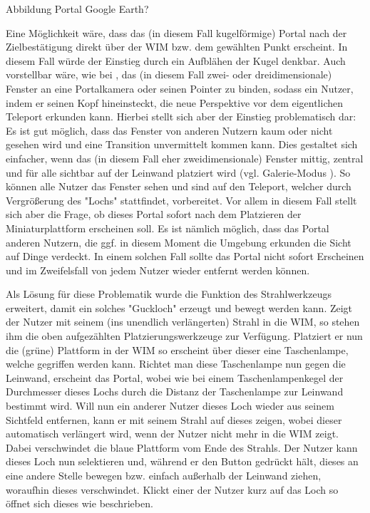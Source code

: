 Abbildung Portal Google Earth?

Eine Möglichkeit wäre, dass das (in diesem Fall kugelförmige) Portal nach der Zielbestätigung direkt über der WIM bzw. dem gewählten Punkt erscheint. In diesem Fall würde der Einstieg durch ein Aufblähen der Kugel denkbar.
Auch vorstellbar wäre, wie bei \cite{Kunert2014Photoportals}, das (in diesem Fall zwei- oder dreidimensionale) Fenster an eine Portalkamera oder seinen Pointer zu binden, sodass ein Nutzer, indem er seinen Kopf hineinsteckt, die neue Perspektive vor dem eigentlichen Teleport erkunden kann. Hierbei stellt sich aber der Einstieg problematisch dar: Es ist gut möglich, dass das Fenster von anderen Nutzern kaum oder nicht gesehen wird und eine Transition unvermittelt kommen kann.
Dies gestaltet sich einfacher, wenn das (in diesem Fall eher zweidimensionale) Fenster mittig, zentral und für alle sichtbar auf der Leinwand platziert wird (vgl. Galerie-Modus \cite{Kunert2014Photoportals}). So können  alle Nutzer das Fenster sehen und sind auf den Teleport, welcher durch Vergrößerung des "Lochs" stattfindet, vorbereitet.
Vor allem in diesem Fall stellt sich aber die Frage, ob dieses Portal sofort nach dem Platzieren der Miniaturplattform erscheinen soll. Es ist nämlich möglich, dass das Portal anderen Nutzern, die ggf. in diesem Moment die Umgebung erkunden die Sicht auf Dinge verdeckt. In einem solchen Fall sollte das Portal nicht sofort Erscheinen und im Zweifelsfall von jedem Nutzer wieder entfernt werden können.

Als Lösung für diese Problematik wurde die Funktion des Strahlwerkzeugs erweitert, damit ein solches "Guckloch" erzeugt und bewegt werden kann.
Zeigt der Nutzer mit seinem (ins unendlich verlängerten) Strahl in die WIM, so stehen ihm die oben aufgezählten Platzierungswerkzeuge zur Verfügung. Platziert er nun die (grüne) Plattform in der WIM so erscheint über dieser eine Taschenlampe, welche gegriffen werden kann. Richtet man diese Taschenlampe nun gegen die Leinwand, erscheint das Portal, wobei wie bei einem Taschenlampenkegel der Durchmesser dieses Lochs durch die Distanz der Taschenlampe zur Leinwand bestimmt wird. Will nun ein anderer Nutzer dieses Loch wieder aus seinem Sichtfeld entfernen, kann er mit seinem Strahl auf dieses zeigen, wobei dieser automatisch verlängert wird, wenn der Nutzer nicht mehr in die WIM zeigt. Dabei verschwindet die blaue Plattform vom Ende des Strahls. Der Nutzer kann dieses Loch nun selektieren und, während er den Button gedrückt hält, dieses an eine andere Stelle bewegen bzw. einfach außerhalb der Leinwand ziehen, woraufhin dieses verschwindet.
Klickt einer der Nutzer kurz auf das Loch so öffnet sich dieses wie beschrieben.

